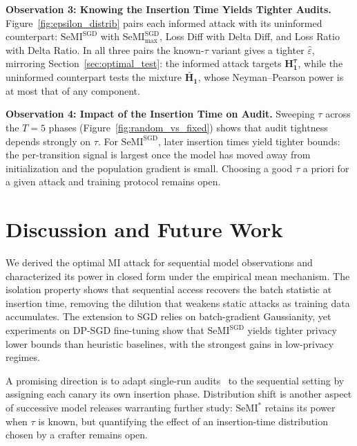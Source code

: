 \documentclass{article}
\theoremstyle{plain}
\theoremstyle{definition}
\theoremstyle{remark}
\newcommand{\SeMIstar}{\mathrm{SeMI}^{\ast}}
\newcommand{\SeMISGD}{\mathrm{SeMI}^{\mathrm{SGD}}}
\newcommand{\SeMISGDmax}{\mathrm{SeMI}^{\mathrm{SGD}}_{\max}}
\begin{document}
\noindent\textbf{Observation 3: Knowing the Insertion Time Yields Tighter Audits.}
\label{sec:exp_unknown_tau}
Figure~\ref{fig:epsilon_distrib} pairs each informed attack with its uninformed counterpart: $\SeMISGD$ with $\SeMISGDmax$, Loss Diff with Delta Diff, and Loss Ratio with Delta Ratio. In all three pairs the known-$\tau$ variant gives a tighter $\hat\varepsilon$, mirroring Section~\ref{sec:optimal_test}: the informed attack targets $\mathbf{H_1^\tau}$, while the uninformed counterpart tests the mixture $\widetilde{\mathbf{H_1}}$, whose Neyman--Pearson power is at most that of any component.

\noindent\textbf{Observation 4: Impact of the Insertion Time on Audit.}
\label{sec:exp_fixed_tau}
Sweeping $\tau$ across the $T=5$ phases (Figure~\ref{fig:random_vs_fixed}) shows that audit tightness depends strongly on $\tau$. For $\SeMISGD$, later insertion times yield tighter bounds: the per-transition signal is largest once the model has moved away from initialization and the population gradient is small. Choosing a good $\tau$ a priori for a given attack and training protocol remains open.


\vspace*{-.6em}\section{Discussion and Future Work}\label{sec:conclusion}\vspace*{-.5em}

We derived the optimal MI attack for sequential model observations and characterized its power in closed form under the empirical mean mechanism. The isolation property shows that sequential access recovers the batch statistic at insertion time, removing the dilution that weakens static attacks as training data accumulates. The extension to SGD relies on batch-gradient Gaussianity, yet experiments on DP-SGD fine-tuning show that $\SeMISGD$ yields tighter privacy lower bounds than heuristic baselines, with the strongest gains in low-privacy regimes.

A promising direction is to adapt single-run audits~\citep{steinkePrivacyAuditingOne2023} to the sequential setting by assigning each canary its own insertion phase. Distribution shift is another aspect of successive model releases warranting further study: $\SeMIstar$ retains its power when $\tau$ is known, but quantifying the effect of an insertion-time distribution chosen by a crafter remains open.
\end{document}
